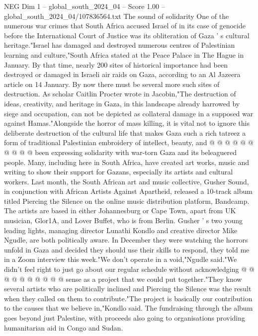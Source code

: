 \begin{textsample}{NEG Dim 1 – global\_south\_2024\_04 – Score 1.00 – global\_south\_2024\_04/107836564.txt}  \label{ex:f1_neg_407}
The sound of solidarity One of the numerous war crimes that South Africa accused Israel of in its case of genocide before the International Court of Justice was its obliteration of Gaza ' s cultural heritage."Israel has damaged and destroyed numerous centres of Palestinian learning and culture,"South Africa stated at the Peace Palace in The Hague in January.
By that time, nearly 200 sites of historical importance had been destroyed or damaged in Israeli air raids on Gaza, according to an Al Jazeera article on 14 January.
By now there must be several more such sites of destruction.
As scholar Caitlin Procter wrote in Jacobin,"The destruction of ideas, creativity, and heritage in Gaza, in this landscape already harrowed by siege and occupation, can not be depicted as collateral damage in a supposed war against Hamas."Alongside the horror of mass killing, it is vital not to ignore this deliberate destruction of the cultural life that makes Gaza such a rich tatreez a form of traditional Palestinian embroidery of intellect, beauty, and @ @ @ @ @ @ @ @ @ @ been expressing solidarity with war-torn Gaza and its beleaguered people.
Many, including here in South Africa, have created art works, music and writing to show their support for Gazans, especially its artists and cultural workers.
Last month, the South African art and music collective, Gusher Sound, in conjunction with African Artists Against Apartheid, released a 10-track album titled Piercing the Silence on the online music distribution platform, Bandcamp.
The artists are based in either Johannesburg or Cape Town, apart from UK musician, Glor1A, and Lover Buffet, who is from Berlin.
Gusher ' s two young leading lights, managing director Lunathi Kondlo and creative director Mike Ngudle, are both politically aware.
In December they were watching the horrors unfold in Gaza and decided they should use their skills to respond, they told me in a Zoom interview this week."We don't operate in a void,"Ngudle said."We didn't feel right to just go about our regular schedule without acknowledging @ @ @ @ @ @ @ @ @ @ sense as a project that we could put together."They know several artists who are politically inclined and Piercing the Silence was the result when they called on them to contribute."The project is basically our contribution to the causes that we believe in,"Kondlo said.
The fundraising through the album goes beyond just Palestine, with proceeds also going to organisations providing humanitarian aid in Congo and Sudan.

\end{textsample}
